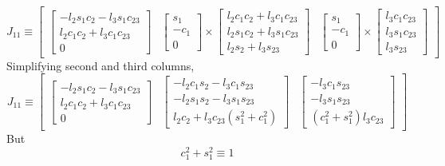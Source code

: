 \documentclass[12pt]{article}
\begin{document}
\[
  J_{11} \equiv
  \begin{bmatrix}
    \begin{bmatrix}
      -l_2s_1c_2 - l_3s_1c_{23} \\
      l_2c_1c_2 + l_3c_1c_{23} \\
      0
    \end{bmatrix}
    &
    \begin{bmatrix} s_1 \\ -c_1 \\ 0 \end{bmatrix}
    \times
    \begin{bmatrix}
      l_2c_1c_2 + l_3c_1c_{23} \\
      l_2s_1c_2 + l_3s_1c_{23} \\
      l_2s_2 + l_3s_{23}
    \end{bmatrix}
    &
    \begin{bmatrix} s_1 \\ -c_1 \\ 0 \end{bmatrix}
    \times
    \begin{bmatrix}
      l_3c_1c_{23} \\
      l_3s_1c_{23} \\
      l_3s_{23}
    \end{bmatrix}
  \end{bmatrix}
\]
Simplifying second and third columns,
\[
  J_{11} \equiv
  \begin{bmatrix}
    \begin{bmatrix}
      -l_2s_1c_2 - l_3s_1c_{23} \\
      l_2c_1c_2 + l_3c_1c_{23} \\
      0
    \end{bmatrix}
    &
    \begin{bmatrix}
      -l_2c_1s_2 - l_3c_1s_{23} \\
      -l_2s_1s_2 - l_3s_1s_{23} \\
      l_2c_2 + l_3c_{23} (s_1^2 + c_1^2)
    \end{bmatrix}
    &
    \begin{bmatrix}
      -l_3c_1s_{23}\\
      -l_3s_1s_{23}\\
      (c_1^2 + s_1^2)l_3c_{23}
    \end{bmatrix}
  \end{bmatrix}
\]
But
\[
  c_1^2 + s_1^2 \equiv 1
\]
\end{document}
